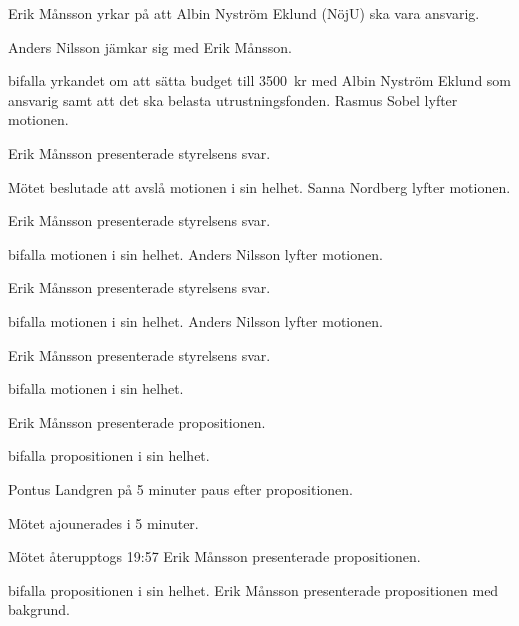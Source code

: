\documentclass[10pt]{article}
\begin{document}
\begin{paragrafer}
\begin{paragrafer}
          Erik Månsson yrkar på att Albin Nyström Eklund (NöjU) ska vara ansvarig.

          Anders Nilsson jämkar sig med Erik Månsson.

          \Mba bifalla yrkandet om att sätta budget till \SI{3500}{kr} med Albin Nyström Eklund som ansvarig samt att det ska belasta utrustningsfonden.
          Rasmus Sobel lyfter motionen.

          Erik Månsson presenterade styrelsens svar.

          Mötet beslutade att avslå motionen i sin helhet.
          Sanna Nordberg lyfter motionen.

          Erik Månsson presenterade styrelsens svar.

          \Mba bifalla motionen i sin helhet.
          Anders Nilsson lyfter motionen.

          Erik Månsson presenterade styrelsens svar.

          \Mba bifalla motionen i sin helhet.
          Anders Nilsson lyfter motionen.

          Erik Månsson presenterade styrelsens svar.

          \Mba bifalla motionen i sin helhet.
      \end{paragrafer}


          \begin{paragrafer}
            Erik Månsson presenterade propositionen.

            \Mba bifalla propositionen i sin helhet.

            Pontus Landgren \ypa på 5 minuter paus efter propositionen.

            Mötet ajounerades i 5 minuter.

            Mötet återupptogs 19:57
            Erik Månsson presenterade propositionen.
            
            \Mba bifalla propositionen i sin helhet.
            Erik Månsson presenterade propositionen med bakgrund.


\end{paragrafer}
\end{paragrafer}
\end{document}
